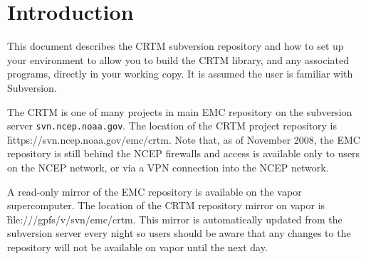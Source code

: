 \chapter{Introduction}
This document describes the CRTM subversion repository and how to set up your environment to allow you to build the CRTM library, and any associated programs, directly in your working copy. It is assumed the user is familiar with Subversion.

The CRTM is one of many projects in main EMC repository on the subversion server \texttt{svn.ncep.noaa.gov}. The location of the CRTM project repository is \f{https://svn.ncep.noaa.gov/emc/crtm}. Note that, as of November 2008, the EMC repository is still behind the NCEP firewalls and access is available only to users on the NCEP network, or via a VPN connection into the NCEP network.

A read-only mirror of the EMC repository is available on the vapor supercomputer. The location of the CRTM repository mirror on vapor is \f{file:///gpfs/v/svn/emc/crtm}. This mirror is automatically updated from the subversion server every night so users should be aware that any changes to the repository will not be available on vapor until the next day.

